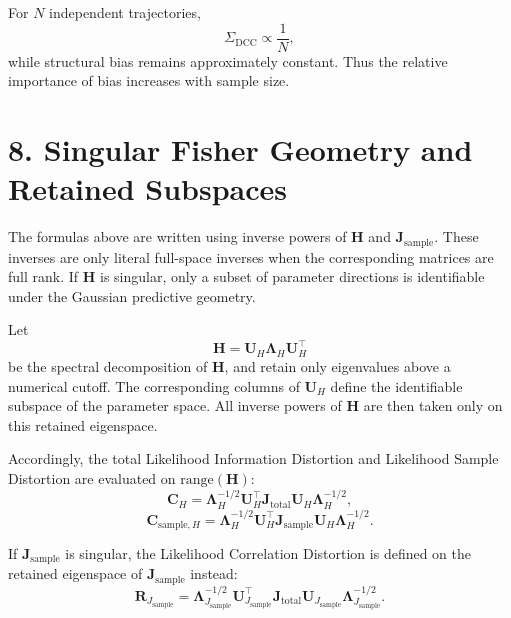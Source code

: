 \documentclass[11pt]{article}
\begin{document}
For $N$ independent trajectories,
\begin{equation}
\Sigma_{\mathrm{DCC}} \propto \frac{1}{N},
\end{equation}
while structural bias remains approximately constant. Thus the relative importance of bias increases with sample size.

\section*{8. Singular Fisher Geometry and Retained Subspaces}

The formulas above are written using inverse powers of $\mathbf H$ and $\mathbf J_{\mathrm{sample}}$.
These inverses are only literal full-space inverses when the corresponding matrices are full rank.
If $\mathbf H$ is singular, only a subset of parameter directions is identifiable under the Gaussian predictive geometry.

Let
\begin{equation}
\mathbf H = \mathbf U_H \mathbf \Lambda_H \mathbf U_H^\top
\end{equation}
be the spectral decomposition of $\mathbf H$, and retain only eigenvalues above a numerical cutoff.
The corresponding columns of $\mathbf U_H$ define the identifiable subspace of the parameter space.
All inverse powers of $\mathbf H$ are then taken only on this retained eigenspace.

Accordingly, the total Likelihood Information Distortion and Likelihood Sample Distortion are evaluated on $\mathrm{range}(\mathbf H)$:
\begin{equation}
\mathbf C_H
=
\mathbf \Lambda_H^{-1/2}
\mathbf U_H^\top \mathbf J_{\mathrm{total}} \mathbf U_H
\mathbf \Lambda_H^{-1/2},
\end{equation}
\begin{equation}
\mathbf C_{\mathrm{sample},H}
=
\mathbf \Lambda_H^{-1/2}
\mathbf U_H^\top \mathbf J_{\mathrm{sample}} \mathbf U_H
\mathbf \Lambda_H^{-1/2}.
\end{equation}

If $\mathbf J_{\mathrm{sample}}$ is singular, the Likelihood Correlation Distortion is defined on the retained eigenspace of $\mathbf J_{\mathrm{sample}}$ instead:
\begin{equation}
\mathbf R_{J_{\mathrm{sample}}}
=
\mathbf \Lambda_{J_{\mathrm{sample}}}^{-1/2}
\mathbf U_{J_{\mathrm{sample}}}^\top \mathbf J_{\mathrm{total}} \mathbf U_{J_{\mathrm{sample}}}
\mathbf \Lambda_{J_{\mathrm{sample}}}^{-1/2}.
\end{equation}
\end{document}
